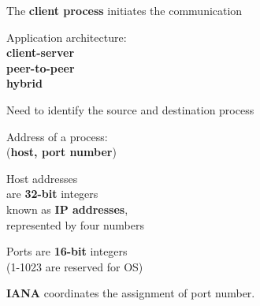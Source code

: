 \begin{frame}\begin{center}\large
	The \textbf{client process} initiates the communication
\end{center}\end{frame}

\begin{frame}\begin{center}\large
	Application architecture: \\
		\textbf{client-server}\\
		\textbf{peer-to-peer}\\
		\textbf{hybrid}\\
\end{center}\end{frame}

\begin{frame}\begin{center}\large
	Need to identify the source and destination process
\end{center}\end{frame}

\begin{frame}\begin{center}\large
	Address of a process:\\
		(\textbf{host, port number})
\end{center}\end{frame}

\begin{frame}\begin{center}\large
	Host addresses\\ are \textbf{32-bit} integers\\
	known as \textbf{IP addresses},\\
	represented by four numbers
\end{center}\end{frame}

\begin{frame}\begin{center}\large
	Ports are \textbf{16-bit} integers\\
	(1-1023 are reserved for OS)
\end{center}\end{frame}

\begin{frame}\begin{center}\large
	\textbf{IANA} coordinates the assignment of port number.
\end{center}\end{frame}


